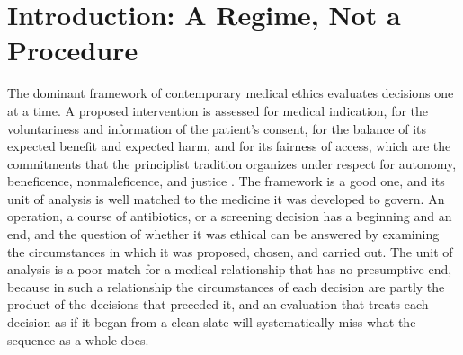 \documentclass[11pt]{article}
\theoremstyle{plain}
\theoremstyle{definition}
\theoremstyle{remark}
\begin{document}
\begin{abstract}
endogenously changing preferences does not compose into consent to the sequence. A feedback model of psychological change shows that external control toward a target accelerates the decay of dependence on the person's initial character, and that the reach of such control is bounded by controllability. A threshold model shows that pressure to continue can arise among individually voluntary choices without any coercing institution. Against this background the strongest case for the technology, that it enlarges autonomy, is formalized and shown to hold, for the future of leaving the regime, exactly when exit costs stay within what the person can bear. The essay closes with three independent protections, the right to continue, the right to discontinue, and the right not to have one's future options made unnecessarily dependent on continued intervention, and with a trajectory-level admissibility condition whose conjuncts are tested against one another. The freedoms of exit, migration, and reconstitution are shown to be independent, and autonomy under reconstruction is argued to require not anatomical reversibility but governability of the system's dependencies. Throughout, documented facts, established mathematical results, labeled hypotheses about the regime, and propositions proved here are kept distinct. Several of the propositions apply standard mathematics to a new interpretation, and the contribution lies in their integration.
\end{abstract}

\section{Introduction: A Regime, Not a Procedure}

The dominant framework of contemporary medical ethics evaluates decisions one at a time. A proposed intervention is assessed for medical indication, for the voluntariness and information of the patient's consent, for the balance of its expected benefit and expected harm, and for its fairness of access, which are the commitments that the principlist tradition organizes under respect for autonomy, beneficence, nonmaleficence, and justice \cite{beauchamp2019}. The framework is a good one, and its unit of analysis is well matched to the medicine it was developed to govern. An operation, a course of antibiotics, or a screening decision has a beginning and an end, and the question of whether it was ethical can be answered by examining the circumstances in which it was proposed, chosen, and carried out. The unit of analysis is a poor match for a medical relationship that has no presumptive end, because in such a relationship the circumstances of each decision are partly the product of the decisions that preceded it, and an evaluation that treats each decision as if it began from a clean slate will systematically miss what the sequence as a whole does.
\end{document}
